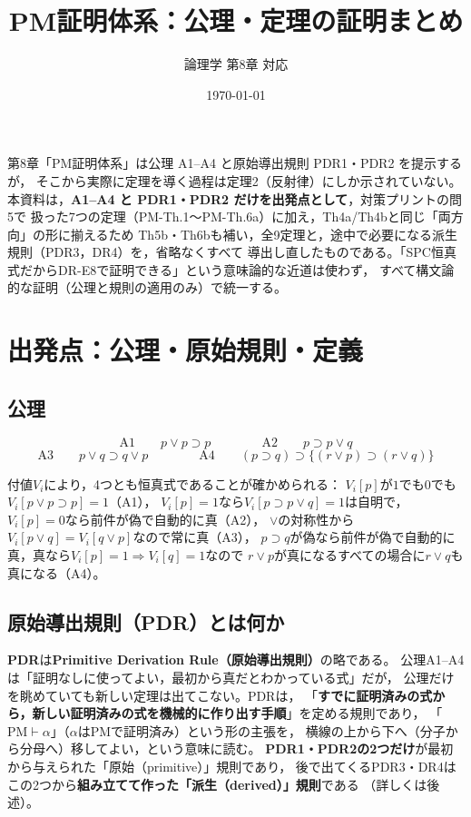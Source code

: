 \documentclass[autodetect-engine,dvi=dvipdfmx,ja=standard]{bxjsarticle}
\title{PM証明体系：公理・定理の証明まとめ}
\author{論理学 第8章 対応}
\date{\today}
\begin{document}
\maketitle

第8章「PM証明体系」は公理 A1--A4 と原始導出規則 PDR1・PDR2 を提示するが，
そこから実際に定理を導く過程は定理2（反射律）にしか示されていない。
本資料は，\textbf{A1--A4 と PDR1・PDR2 だけを出発点として}，対策プリントの問5で
扱った7つの定理（PM-Th.1〜PM-Th.6a）に加え，Th4a/Th4bと同じ「両方向」の形に揃えるため
Th5b・Th6bも補い，全9定理と，途中で必要になる派生規則（PDR3，DR4）を，省略なくすべて
導出し直したものである。「SPC恒真式だからDR-E8で証明できる」という意味論的な近道は使わず，
すべて構文論的な証明（公理と規則の適用のみ）で統一する。

\section{出発点：公理・原始規則・定義}

\subsection*{公理}

\[
  \mathrm{A1}\qquad p\lor p\supset p
  \qquad\qquad
  \mathrm{A2}\qquad p\supset p\lor q
\]
\[
  \mathrm{A3}\qquad p\lor q\supset q\lor p
  \qquad\qquad
  \mathrm{A4}\qquad (p\supset q)\supset\{(r\lor p)\supset(r\lor q)\}
\]

付値\(V_i\)により，4つとも恒真式であることが確かめられる：
\(V_i[p]\)が\(1\)でも\(0\)でも\(V_i[p\lor p\supset p]=1\)（A1），
\(V_i[p]=1\)なら\(V_i[p\supset p\lor q]=1\)は自明で，\(V_i[p]=0\)なら前件が偽で自動的に真（A2），
\(\lor\)の対称性から\(V_i[p\lor q]=V_i[q\lor p]\)なので常に真（A3），
\(p\supset q\)が偽なら前件が偽で自動的に真，真なら\(V_i[p]=1\Rightarrow V_i[q]=1\)なので
\(r\lor p\)が真になるすべての場合に\(r\lor q\)も真になる（A4）。

\subsection*{原始導出規則（PDR）とは何か}

\textbf{PDR}は\textbf{Primitive Derivation Rule（原始導出規則）}の略である。
公理A1--A4は「証明なしに使ってよい，最初から真だとわかっている式」だが，
公理だけを眺めていても新しい定理は出てこない。PDRは，
「\textbf{すでに証明済みの式から，新しい証明済みの式を機械的に作り出す手順}」を定める規則であり，
「\(\mathrm{PM}\vdash\alpha\)」（\(\alpha\)はPMで証明済み）という形の主張を，
横線の上から下へ（分子から分母へ）移してよい，という意味に読む。
\textbf{PDR1・PDR2の2つだけ}が最初から与えられた「原始（primitive）」規則であり，
後で出てくるPDR3・DR4はこの2つから\textbf{組み立てて作った「派生（derived）」規則}である
（詳しくは後述）。
\end{document}
